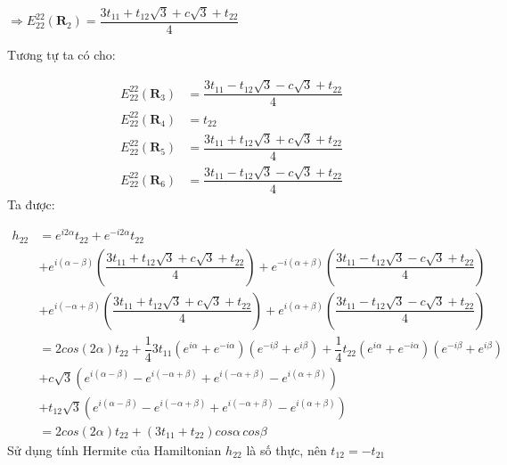 \documentclass{article}
\begin{document}
$\Rightarrow E_{22}^{22}(\mathbf{R}_2) = \dfrac{3t_{11} + t_{12}\sqrt{3} + c\sqrt{3} + t_{22}}{4}$

Tương tự ta có cho:

\begin{align}
    E_{22}^{22}(\mathbf{R}_3) & = \dfrac{3t_{11} - t_{12}\sqrt{3} - c\sqrt{3} + t_{22}}{4} \nonumber \\
    E_{22}^{22}(\mathbf{R}_4) & = t_{22} \nonumber                                                   \\
    E_{22}^{22}(\mathbf{R}_5) & = \dfrac{3t_{11} + t_{12}\sqrt{3} + c\sqrt{3} + t_{22}}{4} \nonumber \\
    E_{22}^{22}(\mathbf{R}_6) & = \dfrac{3t_{11} - t_{12}\sqrt{3} - c\sqrt{3} + t_{22}}{4} \nonumber
\end{align}
\clearpage
Ta được:

\begin{align}
    h_{22} & = e^{ i 2 \alpha} t_{22} + e^{- i 2 \alpha} t_{22} \nonumber                                                                                                                                                                           \\
           & + e^{i(\alpha - \beta)} \left(\dfrac{3t_{11} + t_{12}\sqrt{3} + c\sqrt{3} + t_{22}}{4}\right) +  e^{-i(\alpha + \beta)} \left(\dfrac{3t_{11} - t_{12}\sqrt{3} - c\sqrt{3} + t_{22}}{4}\right) \nonumber                                \\
           & + e^{i(-\alpha + \beta)} \left(\dfrac{3t_{11} + t_{12}\sqrt{3} + c\sqrt{3} + t_{22}}{4}\right) +  e^{i(\alpha + \beta)} \left(\dfrac{3t_{11} - t_{12}\sqrt{3} - c\sqrt{3} + t_{22}}{4}\right) \nonumber                                \\
           & = 2 cos(2\alpha) t_{22} + \dfrac{1}{4}3t_{11} \left(e^{i\alpha} + e^{-i\alpha}\right)\left(e^{-i\beta} + e^{i\beta}\right) + \dfrac{1}{4}t_{22} \left(e^{i\alpha} + e^{-i\alpha}\right)\left(e^{-i\beta} + e^{i\beta}\right) \nonumber \\
           & + c\sqrt{3}(e^{i(\alpha-\beta)} - e^{i(-\alpha+\beta)} +e^{i(-\alpha+\beta)} - e^{i(\alpha+\beta)}) \nonumber                                                                                                                          \\
           & + t_{12}\sqrt{3}(e^{i(\alpha-\beta)} - e^{i(-\alpha+\beta)} + e^{i(-\alpha+\beta)} - e^{i(\alpha+\beta)}) \nonumber                                                                                                                    \\
           & = 2cos(2\alpha) t_{22} + (3t_{11} + t_{22})cos\alpha \, cos\beta \nonumber
\end{align}
Sử dụng tính Hermite của Hamiltonian $h_{22}$ là số thực, nên $t_{12}= - t_{21}$
\end{document}
